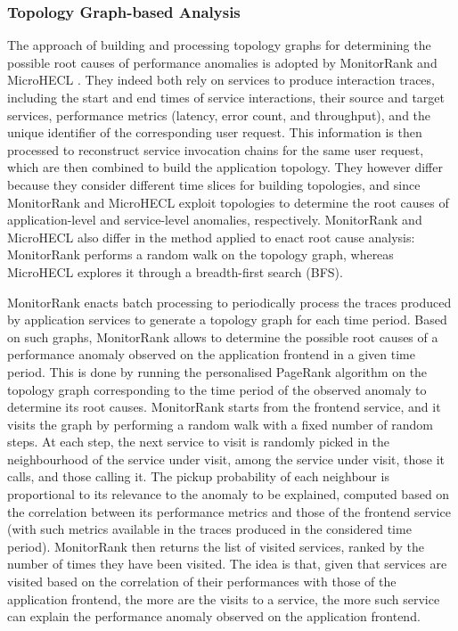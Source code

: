 \subsubsection{{Topology Graph-based Analysis}}
\label{sec:rca:distributed-tracing:topology}
The approach of building and processing topology graphs for determining the possible root causes of performance anomalies is adopted by MonitorRank \cite{21_Kim2013_RootCauseDetectionSOA} and MicroHECL \cite{47_Liu2021_MicroHECL}.
They indeed both rely on services to produce interaction traces, including the start and end times of service interactions, their source and target services, performance metrics (\viz latency, error count, and throughput), and the unique identifier of the corresponding user request. 
This information is then processed to reconstruct service invocation chains for the same user request, which are then combined to build the application topology.
They however differ because they consider different time slices for building topologies, and since MonitorRank \cite{21_Kim2013_RootCauseDetectionSOA} and MicroHECL \cite{47_Liu2021_MicroHECL} exploit topologies to determine the root causes of application-level and service-level anomalies, respectively.
{MonitorRank \cite{21_Kim2013_RootCauseDetectionSOA} and MicroHECL \cite{47_Liu2021_MicroHECL} also differ in the method applied to enact root cause analysis: MonitorRank \cite{21_Kim2013_RootCauseDetectionSOA} performs a random walk on the topology graph, whereas MicroHECL explores it through a breadth-first search (BFS).}

MonitorRank \cite{21_Kim2013_RootCauseDetectionSOA} enacts batch processing to periodically process the traces produced by application services to generate a topology graph for each time period. 
Based on such graphs, MonitorRank \cite{21_Kim2013_RootCauseDetectionSOA} allows to determine the possible root causes of a performance anomaly observed on the application frontend in a given time period.
This is done by running the personalised PageRank algorithm \cite{Glen2003_PersonalizedPageRank} on the topology graph corresponding to the time period of the observed anomaly to determine its root causes.
MonitorRank \cite{21_Kim2013_RootCauseDetectionSOA} starts from the frontend service, and it visits the graph by performing a random walk with a fixed number of random steps.
At each step, the next service to visit is randomly picked in the neighbourhood of the service under visit, \viz among the service under visit, those it calls, and those calling it. 
The pickup probability of each neighbour is proportional to its relevance to the anomaly to be explained, computed based on the correlation between its performance metrics and those of the frontend service (with such metrics available in the traces produced in the considered time period). 
MonitorRank \cite{21_Kim2013_RootCauseDetectionSOA} then returns the list of visited services, ranked by the number of times they have been visited.
The idea is that, given that services are visited based on the correlation of their performances with those of the application frontend, the more are the visits to a service, the more such service can explain the performance anomaly observed on the application frontend. 


